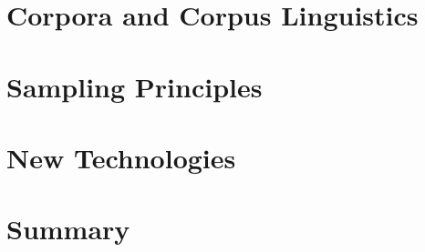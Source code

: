 



\section{Corpora and Corpus Linguistics}
\label{sec:litreview:corpora}




\section{Sampling Principles}
\label{sec:litreview:sampling}




\section{New Technologies} %
\label{sec:litreview:newtech}




\section{Summary}
\label{sec:litreview:summary}

